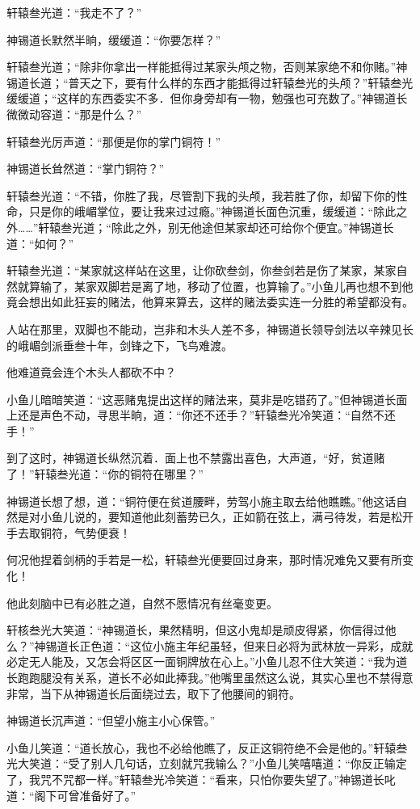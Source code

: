 \documentclass[12pt,oneside]{book}
\begin{document}
轩辕叁光道：``我走不了？''

神锡道长默然半晌，缓缓道：``你要怎样？''

轩辕叁光道；``除非你拿出一样能抵得过某家头颅之物，否则某家绝不和你赌。''神锡道长道；``普天之下，要有什么样的东西才能抵得过轩辕叁光的头颅？''轩辕叁光缓缓道；``这样的东西委实不多．但你身旁却有一物，勉强也可充数了。''神锡道长微微动容道：``那是什么？''

轩辕叁光厉声道：``那便是你的掌门铜符！''

神锡道长耸然道：``掌门铜符？''

轩辕叁光道：``不错，你胜了我，尽管割下我的头颅，我若胜了你，却留下你的性命，只是你的峨嵋掌位，要让我来过过瘾。''神锡道长面色沉重，缓缓道：``除此之外\ldots\ldots{}''轩辕叁光道；``除此之外，别无他途但某家却还可给你个便宜。''神锡道长道：``如何？''

轩辕叁光道：``某家就这样站在这里，让你砍叁剑，你叁剑若是伤了某家，某家自然就算输了，某家双脚若是离了地，移动了位置，也算输了。''小鱼儿再也想不到他竟会想出如此狂妄的赌法，他算来算去，这样的赌法委实连一分胜的希望都没有。

人站在那里，双脚也不能动，岂非和木头人差不多，神锡道长领导剑法以辛辣见长的峨嵋剑派垂叁十年，剑锋之下，飞鸟难渡。

他难道竟会连个木头人都砍不中？

小鱼儿暗暗笑道：``这恶赌鬼提出这样的赌法来，莫非是吃错药了。''但神锡道长面上还是声色不动，寻思半晌，道：``你还不还手？''轩辕叁光冷笑道：``自然不还手！''

到了这时，神锡道长纵然沉着．面上也不禁露出喜色，大声道，``好，贫道赌了！''轩辕叁光道：``你的铜符在哪里？''

神锡道长想了想，道：``铜符便在贫道腰畔，劳驾小施主取去给他瞧瞧。''他这话自然是对小鱼儿说的，要知道他此刻蓄势已久，正如箭在弦上，满弓待发，若是松开手去取铜符，气势便衰！

何况他捏着剑柄的手若是一松，轩辕叁光便要回过身来，那时情况难免又要有所变化！

他此刻脑中已有必胜之道，自然不愿情况有丝毫变更。

轩核叁光大笑道：``神锡道长，果然精明，但这小鬼却是顽皮得紧，你信得过他么？''神锡道长正色道：``这位小施主年纪虽轻，但来日必将为武林放一异彩，成就必定无人能及，又怎会将区区一面铜牌放在心上。''小鱼儿忍不住大笑道：``我为道长跑跑腿没有关系，道长不必如此捧我。''他嘴里虽然这么说，其实心里也不禁得意非常，当下从神锡道长后面绕过去，取下了他腰间的铜符。

神锡道长沉声道：``但望小施主小心保管。''

小鱼儿笑道：``道长放心，我也不必给他瞧了，反正这铜符绝不会是他的。''轩辕叁光大笑道：``受了别人几句话，立刻就咒我输么？''小鱼儿笑嘻嘻道：``你反正输定了，我咒不咒都一样。''轩辕叁光冷笑道：``看来，只怕你要失望了。''神锡道长叱道：``阁下可曾准备好了。''
\end{document}
